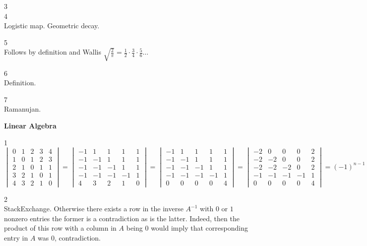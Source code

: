 3 \\


4 \\
Logistic map. Geometric decay.

5 \\
Follows by definition and Wallis $\sqrt{\frac{2}{\pi}}=\frac{1}{2} \cdot \frac{3}{4} \cdot \frac{5}{6} \dots$

6 \\
Definition.

7 \\
Ramanujan.

\newpage

\textbf{Linear Algebra}

1 \\
$
\begin{vmatrix}
0 & 1 & 2 & 3 & 4 \\
1 & 0 & 1 & 2 & 3 \\
2 & 1 & 0 & 1 & 1 \\
3 & 2 & 1 & 0 & 1 \\
4 & 3 & 2 & 1 & 0
\end{vmatrix}
=
\begin{vmatrix}
-1 & 1 & 1 & 1 & 1 \\
-1 & -1 & 1 & 1 & 1 \\
-1 & -1 & -1 & 1 & 1 \\
-1 & -1 & -1 & -1 & 1 \\
4 & 3 & 2 & 1 & 0
\end{vmatrix}
=
\begin{vmatrix}
-1 & 1 & 1 & 1 & 1 \\
-1 & -1 & 1 & 1 & 1 \\
-1 & -1 & -1 & 1 & 1 \\
-1 & -1 & -1 & -1 & 1 \\
0 & 0 & 0 & 0 & 4
\end{vmatrix}
=
\begin{vmatrix}
-2 & 0 & 0 & 0 & 2 \\
-2 & -2 & 0 & 0 & 2 \\
-2 & -2 & -2 & 0 & 2 \\
-1 & -1 & -1 & -1 & 1 \\
0 & 0 & 0 & 0 & 4
\end{vmatrix}
=
\boxed{(-1)^{n-1}(n-1)2^{n-2}}
$

2 \\
StackExchange. Otherwise there exists a row in the inverse $A^{-1}$ with $0$ or $1$ nonzero entries the former is a contradiction as is the latter. Indeed, then the product of this row with a column in $A$ being $0$ would imply that corresponding entry in $A$ was $0$, contradiction.


